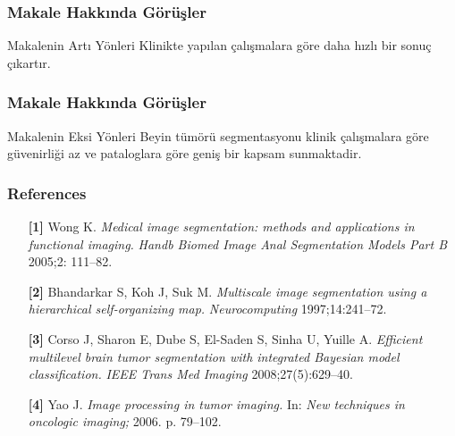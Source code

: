 \documentclass[10pt,xcolor=dvipsnames]{beamer}
\begin{document}
\begin{frame}
\frametitle{Makale Hakkında Görüşler}
\begin{block}{Makalenin Artı Yönleri}
 Klinikte yapılan çalışmalara göre daha hızlı bir sonuç çıkartır.
\end{block}
\end{frame}
\begin{frame}
\frametitle{Makale Hakkında Görüşler}
\begin{block}{Makalenin Eksi Yönleri}
Beyin tümörü segmentasyonu klinik çalışmalara göre güvenirliği az ve pataloglara göre geniş bir kapsam sunmaktadir.
\end{block}
\end{frame}
\begin{frame}
\frametitle{References}

\begin{itemize}
    \item[\textbf{[1]}] Wong K. \emph{Medical image segmentation: methods and applications in functional imaging.} \emph{Handb Biomed Image Anal Segmentation Models Part B} 2005;2: 111--82.
    
    \item[\textbf{[2]}] Bhandarkar S, Koh J, Suk M. \emph{Multiscale image segmentation using a hierarchical self-organizing map.} \emph{Neurocomputing} 1997;14:241--72.
    
    \item[\textbf{[3]}] Corso J, Sharon E, Dube S, El-Saden S, Sinha U, Yuille A. \emph{Efficient multilevel brain tumor segmentation with integrated Bayesian model classification.} \emph{IEEE Trans Med Imaging} 2008;27(5):629--40.
    
    \item[\textbf{[4]}] Yao J. \emph{Image processing in tumor imaging.} In: \emph{New techniques in oncologic imaging;} 2006. p. 79--102.
\end{itemize}

\end{frame}
\end{document}
